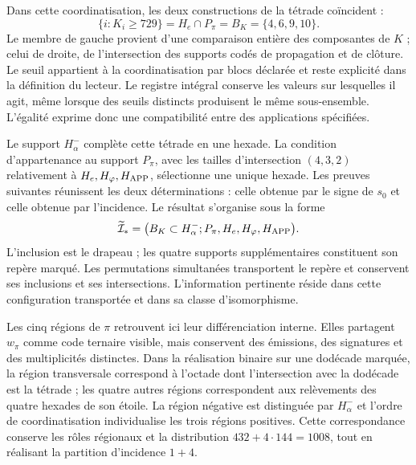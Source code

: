 Dans cette coordinatisation, les deux constructions de la tétrade coïncident :
\begin{equation}
 \{i:K_i\geq729\}
 =H_e\cap P_\pi=B_K=\{4,6,9,10\}.
 \label{inc-ampl-cuaterna}
\end{equation}
Le membre de gauche provient d'une comparaison entière des composantes
de $K$ ; celui de droite, de l'intersection des supports codés de
propagation et de clôture. Le seuil appartient à la coordinatisation par blocs
déclarée et reste explicité dans la définition du lecteur. Le
registre intégral conserve les valeurs sur lesquelles il agit, même lorsque
des seuils distincts produisent le même sous-ensemble. L'égalité exprime
donc une compatibilité entre des applications spécifiées.

Le support $H^-_\alpha$ complète cette tétrade en une hexade. La
condition d'appartenance au support $P_\pi$, avec les tailles
d'intersection $(4,3,2)$ relativement à $H_e,H_\varphi,H_{\rm APP}$,
sélectionne une unique hexade. Les preuves suivantes réunissent les deux
déterminations : celle obtenue par le signe de $s_0$ et celle obtenue
par l'incidence. Le résultat s'organise sous la forme
\begin{equation}
 \widetilde{\mathcal I}_*
 =\bigl(B_K\subset H^-_\alpha;
         P_\pi,H_e,H_\varphi,H_{\rm APP}\bigr).
 \label{inc-ampl-marco}
\end{equation}
L'inclusion est le drapeau ; les quatre supports supplémentaires constituent
son repère marqué. Les permutations simultanées transportent le repère et
conservent ses inclusions et ses intersections. L'information pertinente réside
dans cette configuration transportée et dans sa classe d'isomorphisme.

Les cinq régions de $\pi$ retrouvent ici leur différenciation interne.
Elles partagent $w_\pi$ comme code ternaire visible, mais conservent des émissions,
des signatures et des multiplicités distinctes. Dans la réalisation binaire sur une
dodécade marquée, la région transversale correspond à l'octade dont
l'intersection avec la dodécade est la tétrade ; les quatre autres régions
correspondent aux relèvements des quatre hexades de son étoile. La
région négative est distinguée par $H^-_\alpha$ et l'ordre de coordinatisation
individualise les trois régions positives. Cette correspondance conserve
les rôles régionaux et la distribution $432+4\cdot144=1008$, tout en
réalisant la partition d'incidence $1+4$.

